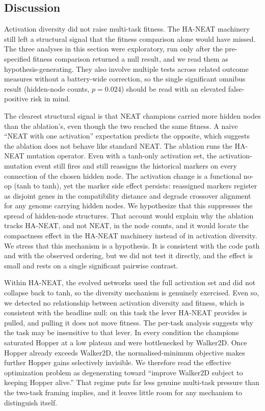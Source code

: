 \documentclass[12pt]{article}
\begin{document}
\subsection{Discussion}
\label{sec:main-discussion}

Activation diversity did not raise multi-task fitness.
The HA-NEAT machinery still left a structural signal that the fitness comparison alone would have missed.
The three analyses in this section were exploratory, run only after the pre-specified fitness comparison returned a null result, and we read them as hypothesis-generating.
They also involve multiple tests across related outcome measures without a battery-wide correction, so the single significant omnibus result (hidden-node counts, $p = 0.024$) should be read with an elevated false-positive risk in mind.

The clearest structural signal is that NEAT champions carried more hidden nodes than the ablation's, even though the two reached the same fitness.
A naive ``NEAT with one activation'' expectation predicts the opposite, which suggests the ablation does not behave like standard NEAT.
The ablation runs the HA-NEAT mutation operator.
Even with a tanh-only activation set, the activation-mutation event still fires and still reassigns the historical markers on every connection of the chosen hidden node.
The activation change is a functional no-op (tanh to tanh), yet the marker side effect persists: reassigned markers register as disjoint genes in the compatibility distance and degrade crossover alignment for any genome carrying hidden nodes.
We hypothesize that this suppresses the spread of hidden-node structures.
That account would explain why the ablation tracks HA-NEAT, and not NEAT, in the node counts, and it would locate the compactness effect in the HA-NEAT machinery instead of in activation diversity.
We stress that this mechanism is a hypothesis.
It is consistent with the code path and with the observed ordering, but we did not test it directly, and the effect is small and rests on a single significant pairwise contrast.

Within HA-NEAT, the evolved networks used the full activation set and did not collapse back to tanh, so the diversity mechanism is genuinely exercised.
Even so, we detected no relationship between activation diversity and fitness, which is consistent with the headline null: on this task the lever HA-NEAT provides is pulled, and pulling it does not move fitness.
The per-task analysis suggests why the task may be insensitive to that lever.
In every condition the champions saturated Hopper at a low plateau and were bottlenecked by Walker2D.
Once Hopper already exceeds Walker2D, the normalised-minimum objective makes further Hopper gains selectively invisible.
We therefore read the effective optimization problem as degenerating toward ``improve Walker2D subject to keeping Hopper alive.''
That regime puts far less genuine multi-task pressure than the two-task framing implies, and it leaves little room for any mechanism to distinguish itself.
\end{document}

